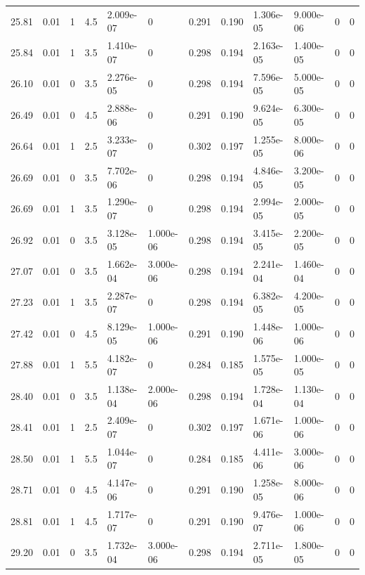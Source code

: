 \documentclass[preview]{standalone}
\begin{document}
{{{\begin{tabular}{L{1.2cm}C{1.2cm} C{0.3cm}C{0.5cm} C{1.4cm}C{1.4cm} C{1.4cm}C{1.4cm} C{1.6cm}C{1.6cm} C{1.6cm}C{1.6cm}}
  25.81  &  0.01  & 1     & 4.5 &  2.009e-07  & 0  &  0.291&   0.190& 1.306e-05 & 9.000e-06   &  0 & 0  \\ 
  25.84  &  0.01  & 1     & 3.5 &  1.410e-07  & 0  &  0.298&   0.194& 2.163e-05 & 1.400e-05   &  0 & 0  \\ 
  26.10  &  0.01  & 0     & 3.5 &  2.276e-05  & 0  &  0.298&   0.194& 7.596e-05 & 5.000e-05   &  0 & 0  \\ 
  26.49  &  0.01  & 0     & 4.5 &  2.888e-06  & 0  &  0.291&   0.190& 9.624e-05 & 6.300e-05   &  0 & 0  \\ 
  26.64  &  0.01  & 1     & 2.5 &  3.233e-07  & 0  &  0.302&   0.197& 1.255e-05 & 8.000e-06   &  0 & 0  \\ 
  26.69  &  0.01  & 0     & 3.5 &  7.702e-06  & 0  &  0.298&   0.194& 4.846e-05 & 3.200e-05   &  0 & 0  \\ 
  26.69  &  0.01  & 1     & 3.5 &  1.290e-07  & 0  &  0.298&   0.194& 2.994e-05 & 2.000e-05   &  0 & 0  \\ 
  26.92  &  0.01  & 0     & 3.5 &  3.128e-05  & 1.000e-06  &  0.298&   0.194& 3.415e-05 & 2.200e-05   &  0 & 0  \\ 
  27.07  &  0.01  & 0     & 3.5 &  1.662e-04  & 3.000e-06  &  0.298&   0.194& 2.241e-04 & 1.460e-04   &  0 & 0  \\ 
  27.23  &  0.01  & 1     & 3.5 &  2.287e-07  & 0  &  0.298&   0.194& 6.382e-05 & 4.200e-05   &  0 & 0  \\ 
  27.42  &  0.01  & 0     & 4.5 &  8.129e-05  & 1.000e-06  &  0.291&   0.190& 1.448e-06 & 1.000e-06   &  0 & 0  \\ 
  27.88  &  0.01  & 1     & 5.5 &  4.182e-07  & 0  &  0.284&   0.185& 1.575e-05 & 1.000e-05   &  0 & 0  \\ 
  28.40  &  0.01  & 0     & 3.5 &  1.138e-04  & 2.000e-06  &  0.298&   0.194& 1.728e-04 & 1.130e-04   &  0 & 0  \\ 
  28.41  &  0.01  & 1     & 2.5 &  2.409e-07  & 0  &  0.302&   0.197& 1.671e-06 & 1.000e-06   &  0 & 0  \\ 
  28.50  &  0.01  & 1     & 5.5 &  1.044e-07  & 0  &  0.284&   0.185& 4.411e-06 & 3.000e-06   &  0 & 0  \\ 
  28.71  &  0.01  & 0     & 4.5 &  4.147e-06  & 0  &  0.291&   0.190& 1.258e-05 & 8.000e-06   &  0 & 0  \\ 
  28.81  &  0.01  & 1     & 4.5 &  1.717e-07  & 0  &  0.291&   0.190& 9.476e-07 & 1.000e-06   &  0 & 0  \\ 
  29.20  &  0.01  & 0     & 3.5 &  1.732e-04  & 3.000e-06  &  0.298&   0.194& 2.711e-05 & 1.800e-05   &  0 & 0  \\ 

\end{tabular}}}}
\end{document}
